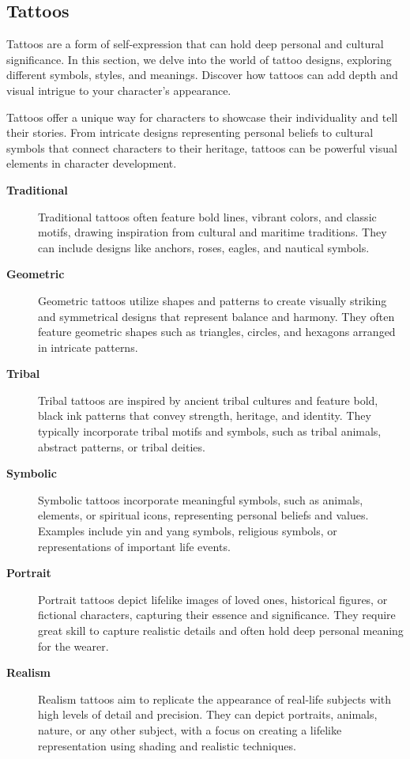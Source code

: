 \documentclass[12pt]{book}  %
\begin{document}
\subsection{\textbf{Tattoos}}

Tattoos are a form of self-expression that can hold deep personal and cultural significance. In this section, we delve into the world of tattoo designs, exploring different symbols, styles, and meanings. Discover how tattoos can add depth and visual intrigue to your character's appearance.

Tattoos offer a unique way for characters to showcase their individuality and tell their stories. From intricate designs representing personal beliefs to cultural symbols that connect characters to their heritage, tattoos can be powerful visual elements in character development.

\begin{description}
    \item[\textbf{Traditional}] Traditional tattoos often feature bold lines, vibrant colors, and classic motifs, drawing inspiration from cultural and maritime traditions. They can include designs like anchors, roses, eagles, and nautical symbols.
    
    \item[\textbf{Geometric}] Geometric tattoos utilize shapes and patterns to create visually striking and symmetrical designs that represent balance and harmony. They often feature geometric shapes such as triangles, circles, and hexagons arranged in intricate patterns.
    
    \item[\textbf{Tribal}] Tribal tattoos are inspired by ancient tribal cultures and feature bold, black ink patterns that convey strength, heritage, and identity. They typically incorporate tribal motifs and symbols, such as tribal animals, abstract patterns, or tribal deities.
    
    \item[\textbf{Symbolic}] Symbolic tattoos incorporate meaningful symbols, such as animals, elements, or spiritual icons, representing personal beliefs and values. Examples include yin and yang symbols, religious symbols, or representations of important life events.
    
    \item[\textbf{Portrait}] Portrait tattoos depict lifelike images of loved ones, historical figures, or fictional characters, capturing their essence and significance. They require great skill to capture realistic details and often hold deep personal meaning for the wearer.
    
    \item[\textbf{Realism}] Realism tattoos aim to replicate the appearance of real-life subjects with high levels of detail and precision. They can depict portraits, animals, nature, or any other subject, with a focus on creating a lifelike representation using shading and realistic techniques.
\end{description}
\end{document}

